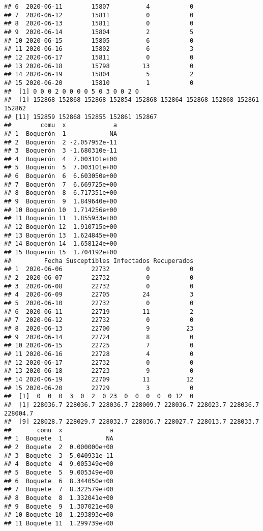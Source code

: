 \documentclass[
]{article}
\begin{document}
\begin{verbatim}
## 6  2020-06-11        15807          4           0
## 7  2020-06-12        15811          0           0
## 8  2020-06-13        15811          0           0
## 9  2020-06-14        15804          2           5
## 10 2020-06-15        15805          6           0
## 11 2020-06-16        15802          6           3
## 12 2020-06-17        15811          0           0
## 13 2020-06-18        15798         13           0
## 14 2020-06-19        15804          5           2
## 15 2020-06-20        15810          1           0
##  [1] 0 0 0 2 0 0 0 0 5 0 3 0 0 2 0
##  [1] 152868 152868 152868 152854 152868 152864 152868 152868 152861 152862
## [11] 152859 152868 152855 152861 152867
##        comu  x             a
## 1  Boquerón  1            NA
## 2  Boquerón  2 -2.057952e-11
## 3  Boquerón  3 -1.680310e-11
## 4  Boquerón  4  7.003101e+00
## 5  Boquerón  5  7.003101e+00
## 6  Boquerón  6  6.603050e+00
## 7  Boquerón  7  6.669725e+00
## 8  Boquerón  8  6.717351e+00
## 9  Boquerón  9  1.849640e+00
## 10 Boquerón 10  1.714256e+00
## 11 Boquerón 11  1.855933e+00
## 12 Boquerón 12  1.910715e+00
## 13 Boquerón 13  1.624845e+00
## 14 Boquerón 14  1.658124e+00
## 15 Boquerón 15  1.704192e+00
##         Fecha Susceptibles Infectados Recuperados
## 1  2020-06-06        22732          0           0
## 2  2020-06-07        22732          0           0
## 3  2020-06-08        22732          0           0
## 4  2020-06-09        22705         24           3
## 5  2020-06-10        22732          0           0
## 6  2020-06-11        22719         11           2
## 7  2020-06-12        22732          0           0
## 8  2020-06-13        22700          9          23
## 9  2020-06-14        22724          8           0
## 10 2020-06-15        22725          7           0
## 11 2020-06-16        22728          4           0
## 12 2020-06-17        22732          0           0
## 13 2020-06-18        22723          9           0
## 14 2020-06-19        22709         11          12
## 15 2020-06-20        22729          3           0
##  [1]  0  0  0  3  0  2  0 23  0  0  0  0  0 12  0
##  [1] 228036.7 228036.7 228036.7 228009.7 228036.7 228023.7 228036.7 228004.7
##  [9] 228028.7 228029.7 228032.7 228036.7 228027.7 228013.7 228033.7
##       comu  x             a
## 1  Boquete  1            NA
## 2  Boquete  2  0.000000e+00
## 3  Boquete  3 -5.040931e-11
## 4  Boquete  4  9.005349e+00
## 5  Boquete  5  9.005349e+00
## 6  Boquete  6  8.344050e+00
## 7  Boquete  7  8.322579e+00
## 8  Boquete  8  1.332041e+00
## 9  Boquete  9  1.307021e+00
## 10 Boquete 10  1.293893e+00
## 11 Boquete 11  1.299739e+00

\end{verbatim}
\end{document}
